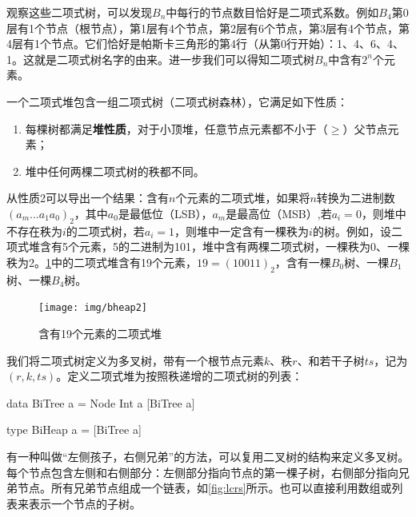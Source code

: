 \documentclass[b5paper]{ctexart}
\begin{document}
观察这些二项式树，可以发现$B_n$中每行的节点数目恰好是二项式系数。例如$B_4$第0层有1个节点（根节点），第1层有4个节点，第2层有6个节点，第3层有4个节点，第4层有1个节点。它们恰好是帕斯卡三角形的第4行（从第0行开始）：1、4、6、4、1。这就是二项式树名字的由来。进一步我们可以得知二项式树$B_n$中含有$2^n$个元素。

一个二项式堆包含一组二项式树（二项式树森林），它满足如下性质：

\begin{enumerate}
\item 每棵树都满足\textbf{堆性质}，对于小顶堆，任意节点元素都不小于（$\geq$）父节点元素；
\item 堆中任何两棵二项式树的秩都不同。
\end{enumerate}

从性质2可以导出一个结果：含有$n$个元素的二项式堆，如果将$n$转换为二进制数$(a_m ... a_1 a_0)_2$，其中$a_0$是最低位（LSB），$a_m$是最高位（MSB）,若$a_i=0$，则堆中不存在秩为$i$的二项式树，若$a_i = 1$，则堆中一定含有一棵秩为$i$的树。例如，设二项式堆含有5个元素，5的二进制为101，堆中含有两棵二项式树，一棵秩为0、一棵秩为2。\cref{fig:bheap2}中的二项式堆含有19个元素，$19 = (10011)_2$，含有一棵$B_0$树、一棵$B_1$树、一棵$B_4$树。

\begin{figure}[htbp]
  \centering
  \texttt{[image: img/bheap2]}
  \caption{含有19个元素的二项式堆}
  \label{fig:bheap2}
\end{figure}

我们将二项式树定义为多叉树，带有一个根节点元素$k$、秩$r$、和若干子树$ts$，记为$(r, k, ts)$。定义二项式堆为按照秩递增的二项式树的列表：

\lstset{frame=single}
\begin{Haskell}
data BiTree a = Node Int a [BiTree a]

type BiHeap a = [BiTree a]
\end{Haskell}

有一种叫做“左侧孩子，右侧兄弟”\cite{CLRS}的方法，可以复用二叉树的结构来定义多叉树。每个节点包含左侧和右侧部分：左侧部分指向节点的第一棵子树，右侧部分指向兄弟节点。所有兄弟节点组成一个链表，如\cref{fig:lcrs}所示。也可以直接利用数组或列表来表示一个节点的子树。
\end{document}
